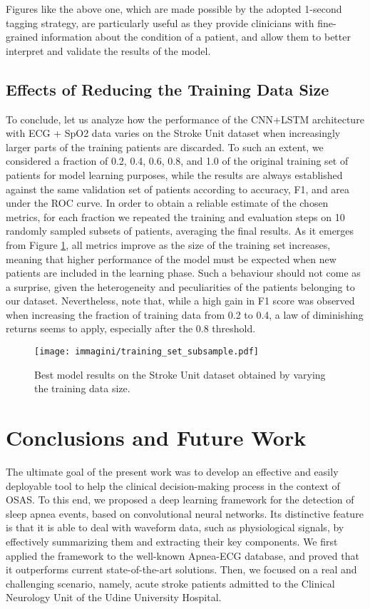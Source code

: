 \documentclass[5p,twocolumn,lefttitle]{elsarticle}
\begin{document}
Figures like the above one, which are made possible by the adopted 1-second tagging strategy, are particularly useful as they provide clinicians with fine-grained information about the condition of a patient, and allow them to better interpret and validate the results of the model. 


\subsection{Effects of Reducing the Training Data Size}

To conclude, let us analyze how the performance of the CNN+LSTM architecture with ECG + SpO2 data varies on the Stroke Unit dataset when increasingly larger parts of the training patients are discarded. 
To such an extent, we considered a fraction of 0.2, 0.4, 0.6, 0.8, and 1.0 of the original training set of patients for model learning purposes, while the results are always established against the same validation set of patients according to accuracy, F1, and area under the ROC curve. In order to obtain a reliable estimate of the chosen metrics, for each fraction we repeated the training and evaluation steps on 10 randomly sampled subsets of patients, averaging the final results. As it emerges from Figure \ref{fig:trainred}, all metrics improve as the size of the training set increases, meaning that higher performance of the model must be expected when new patients are included in the learning phase. Such a behaviour should not come as a surprise, given the heterogeneity and peculiarities of the patients belonging to our dataset. Nevertheless, note that, while a high gain in F1 score was observed when increasing the fraction of training data from 0.2 to 0.4, a law of diminishing returns seems to apply, especially after the 0.8 threshold. 


\begin{figure}[t]
    \centering
    \texttt{[image: immagini/training\_set\_subsample.pdf]}
    \caption{Best model results on the Stroke Unit dataset obtained by varying the training data size.}
    \label{fig:trainred}
\end{figure}



\section{Conclusions and Future Work}

The ultimate goal of the present work was to develop an effective and easily deployable tool to help the clinical decision-making process in the context of OSAS. To this end,
we proposed a deep learning framework for the detection of sleep apnea events, based on convolutional neural networks. Its distinctive feature is that it is able to deal with waveform data, such as physiological signals, by effectively summarizing them and extracting their key components. We first applied the framework to the well-known Apnea-ECG database, and proved that it outperforms current state-of-the-art solutions. Then, we focused on a real and challenging scenario, namely, acute stroke patients admitted to the Clinical Neurology Unit of the Udine University Hospital. 
\end{document}
